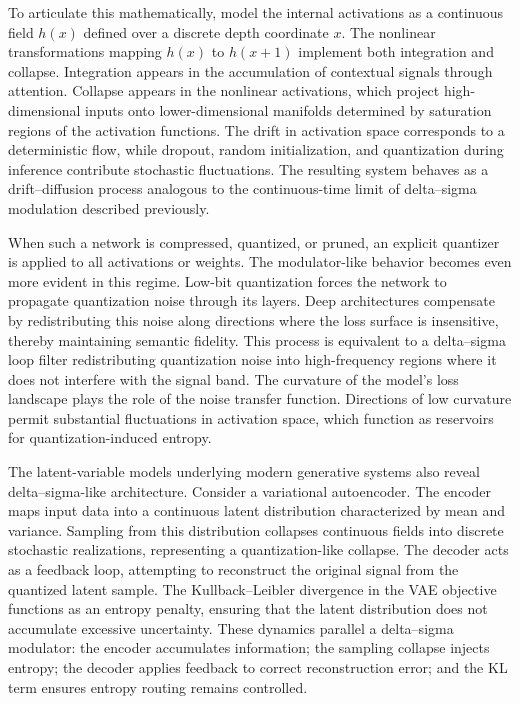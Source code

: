 To articulate this mathematically, model the internal activations as a continuous field \(h(x)\) defined over a discrete depth coordinate \(x\). The nonlinear transformations mapping \(h(x)\) to \(h(x+1)\) implement both integration and collapse. Integration appears in the accumulation of contextual signals through attention. Collapse appears in the nonlinear activations, which project high-dimensional inputs onto lower-dimensional manifolds determined by saturation regions of the activation functions. The drift in activation space corresponds to a deterministic flow, while dropout, random initialization, and quantization during inference contribute stochastic fluctuations. The resulting system behaves as a drift–diffusion process analogous to the continuous-time limit of delta–sigma modulation described previously.

When such a network is compressed, quantized, or pruned, an explicit quantizer is applied to all activations or weights. The modulator-like behavior becomes even more evident in this regime. Low-bit quantization forces the network to propagate quantization noise through its layers. Deep architectures compensate by redistributing this noise along directions where the loss surface is insensitive, thereby maintaining semantic fidelity. This process is equivalent to a delta–sigma loop filter redistributing quantization noise into high-frequency regions where it does not interfere with the signal band. The curvature of the model’s loss landscape plays the role of the noise transfer function. Directions of low curvature permit substantial fluctuations in activation space, which function as reservoirs for quantization-induced entropy.

The latent-variable models underlying modern generative systems also reveal delta–sigma-like architecture. Consider a variational autoencoder. The encoder maps input data into a continuous latent distribution characterized by mean and variance. Sampling from this distribution collapses continuous fields into discrete stochastic realizations, representing a quantization-like collapse. The decoder acts as a feedback loop, attempting to reconstruct the original signal from the quantized latent sample. The Kullback–Leibler divergence in the VAE objective functions as an entropy penalty, ensuring that the latent distribution does not accumulate excessive uncertainty. These dynamics parallel a delta–sigma modulator: the encoder accumulates information; the sampling collapse injects entropy; the decoder applies feedback to correct reconstruction error; and the KL term ensures entropy routing remains controlled.

